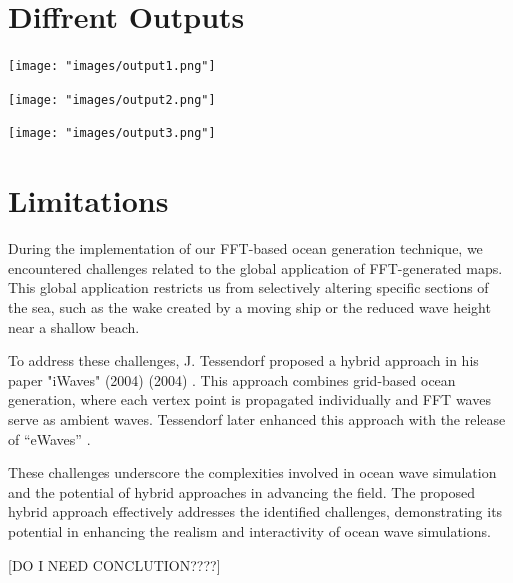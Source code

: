 \section{Diffrent Outputs}

\begin{minipage}[t]{1\textwidth}
    \centering
    \texttt{[image: "images/output1.png"]}
    \label{fig:output_1}
\end{minipage}
\begin{minipage}[t]{1\textwidth}
    \centering
    \texttt{[image: "images/output2.png"]}
    \label{fig:output_2}
\end{minipage}

\begin{minipage}{1\textwidth}
    \centering
    \texttt{[image: "images/output3.png"]}
    \label{fig:output_3}
\end{minipage}

\section{Limitations}
During the implementation of our FFT-based ocean generation technique, we encountered challenges related to the global application of FFT-generated maps. This global application restricts us from selectively altering specific sections of the sea, such as the wake created by a moving ship or the reduced wave height near a shallow beach.

To address these challenges, J. Tessendorf proposed a hybrid approach in his paper "iWaves" (2004) (2004) \cite{tessendorf2004}. This approach combines grid-based ocean generation, where each vertex point is propagated individually and FFT waves serve as ambient waves. Tessendorf later enhanced this approach with the release of “eWaves” \cite{tessendorf2014}.

These challenges underscore the complexities involved in ocean wave simulation and the potential of hybrid approaches in advancing the field. The proposed hybrid approach effectively addresses the identified challenges, demonstrating its potential in enhancing the realism and interactivity of ocean wave simulations.


[DO I NEED CONCLUTION????]